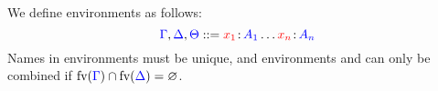 \begin{definition}[Environments]\label{def:cp-environments}
  We define environments as follows:
  \[
    \textcolor{blue}{\Gamma}, \textcolor{blue}{\Delta}, \textcolor{blue}{\Theta}
    ::= \textcolor{red}{x_1}\colon\!\textcolor{blue}{A_1}\dots\textcolor{red}{x_n}\colon\!\textcolor{blue}{A_n}
  \] 
  Names in environments must be unique, and environments \ty{\Gamma} and
  \ty{\Delta} can only be combined if
  $\text{fv}(\textcolor{blue}{\Gamma}) \cap \text{fv}(\textcolor{blue}{\Delta}) = \varnothing$.
\end{definition}
